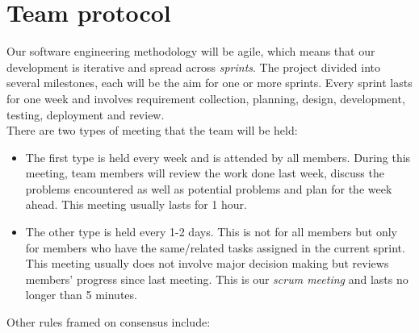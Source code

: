 \section{Team protocol}

Our software engineering methodology will be agile, which means that our development is iterative and spread across \emph{sprints}. The project divided into several milestones, each will be the aim for one or more sprints. Every sprint lasts for one week and involves requirement collection, planning, design, development, testing, deployment and review.\\

There are two types of meeting that the team will be held:

\begin{itemize}

\item The first type is held every week and is attended by all members. During this meeting, team members will review the work done last week, discuss the problems encountered as well as potential problems and plan for the week ahead. This meeting usually lasts for 1 hour.

\item The other type is held every 1-2 days. This is not for all members but only for members who have the same/related tasks assigned in the current sprint. This meeting usually does not involve major decision making but reviews members' progress since last meeting. This is our \emph{scrum meeting} and lasts no longer than 5 minutes.

\end{itemize}

Other rules framed on consensus include:


